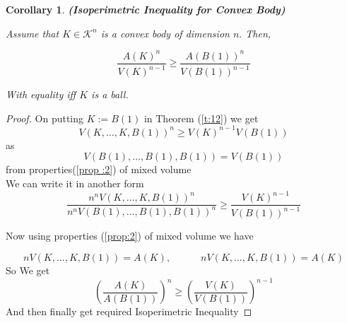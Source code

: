\documentclass[oneside]{book}
\newtheorem{corollary}{Corollary}[section]
\begin{document}
	\hfill \break
	
	
	
	
	
	
	
	
	
	
	
	
	\begin{corollary}\textbf{(Isoperimetric Inequality for Convex Body)}       
		\label{cor:3}    
		
		Assume that $K \in \mathcal{K}^{n}$ is a convex body of dimension $n .$ Then,
		
		$$\frac{{A(K)}^n}{{V(K)}^{n-1}} \geq \frac{{A(B(1))}^{n}}{{V(B(1))}^{n-1}} $$
		
		With equality iff  $K$ is a ball.
		
	\end{corollary}
	\begin{proof}
		
		
		On putting $K:=B(1)$ in Theorem (\ref{t:12}) we get 
		\[
		V(K, \ldots, K, B(1))^{n} \geq V(K)^{n-1} V(B(1))
		\]
		as $$V(B(1), \ldots, B(1), B(1)) = V(B(1))$$ from properties(\ref{prop :2}) of mixed volume \\
		
		We can write it in another form
		\[
		\frac{n^{n} V(K, \ldots, K, B(1))^{n}}{n^{n} V(B(1), \ldots, B(1), B(1))^{n}} \geq \frac{V(K)^{n-1}}{V(B(1))^{n-1}}
		\]
		
		Now using  properties (\ref{prop:2}) of mixed volume we have
		
		$$ nV(K, ..., K, B(1)) = A(K),\quad  \quad \quad nV(K, ..., K, B(1)) = A(K) $$ 
		So
		We get \[
		\left(\frac{A(K)}{A(B(1))}\right)^{n} \geq\left(\frac{V(K)}{V(B(1))}\right)^{n-1}
		\]
		And then finally get required Isoperimetric Inequality
	\end{proof}
	
\end{document}
